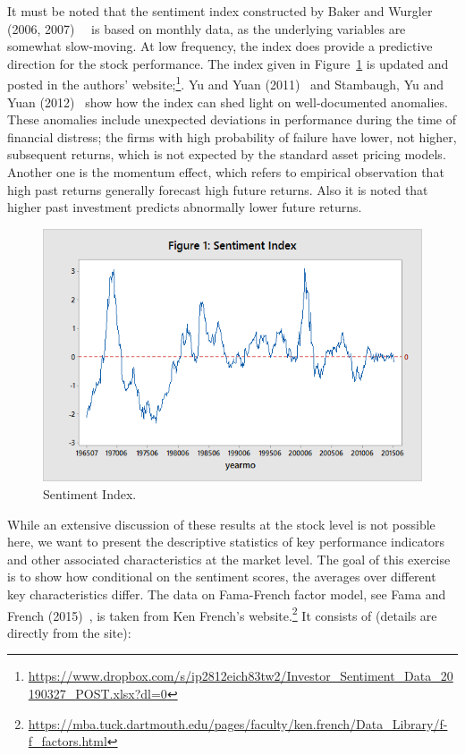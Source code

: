  
It must be noted that the sentiment index constructed by Baker and Wurgler (2006, 2007)~\cite{baker2006investor}~\cite{baker2007investor} is based on monthly data, as the underlying variables are somewhat slow-moving. At low frequency, the index does provide a predictive direction for the stock performance. The index given in Figure~\ref{fig:sentimentindex} is updated and posted in the authors' website;\footnote{\url{https://www.dropbox.com/s/ip2812eich83tw2/Investor_Sentiment_Data_20190327_POST.xlsx?dl=0}}. Yu and Yuan (2011)~\cite{yuyuan} and Stambaugh, Yu and Yuan (2012)~\cite{stamb} show how the index can shed light on well-documented anomalies. These anomalies include unexpected deviations in performance during the time of financial distress; the firms with high probability of failure have lower, not higher, subsequent returns, which is not expected by the standard asset pricing models. Another one is the momentum effect, which refers to empirical observation that high past returns generally forecast high future returns. Also it is noted that higher past investment predicts abnormally lower future returns. 
	 \begin{figure}[!ht]
	\centering
	\includegraphics[width=\textwidth]{chapters/chapter_news_an/figures/ch4sec1sentimentindex.png}
	\caption{Sentiment Index.\label{fig:sentimentindex}}
	\end{figure}


While an extensive discussion of these results at the stock level is not possible here, we want to present the descriptive statistics of key performance indicators and other associated characteristics at the market level. The goal of this exercise is to show how conditional on the sentiment scores, the averages over different key characteristics differ. The data on Fama-French factor model, see Fama and French (2015)~\cite{fama2015international}, is taken from Ken French's website.\footnote{\url{https://mba.tuck.dartmouth.edu/pages/faculty/ken.french/Data_Library/f-f_factors.html}} It consists of (details are directly from the site):


